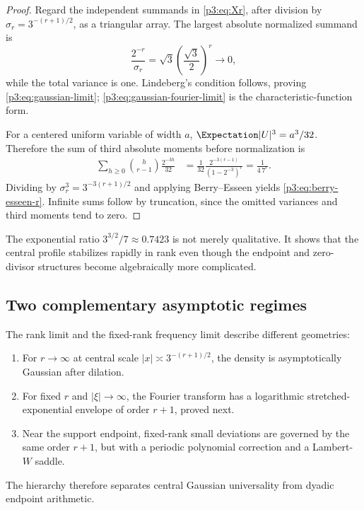 \documentclass[11pt,oneside]{article}
\theoremstyle{definition}
\theoremstyle{remark}
\begin{document}
\begin{proof}
Regard the independent summands in \eqref{p3:eq:Xr}, after division by
$\sigma_r=3^{-(r+1)/2}$, as a triangular array.  The largest absolute normalized summand is
\[
 \frac{2^{-r}}{\sigma_r}
 =\sqrt3\left(\frac{\sqrt3}{2}\right)^r\longrightarrow0,
\]
while the total variance is one.  Lindeberg's condition follows, proving \eqref{p3:eq:gaussian-limit}; \eqref{p3:eq:gaussian-fourier-limit} is the characteristic-function form.

For a centered uniform variable of width $a$, $\Expectation|U|^3=a^3/32$.  Therefore the sum of third absolute moments before normalization is
\begin{align*}
 \sum_{h\ge0}\binom h{r-1}\frac{2^{-3h}}{32}
 &=\frac1{32}\frac{2^{-3(r-1)}}{(1-2^{-3})^r}
 =\frac1{4\,7^r}.
\end{align*}
Dividing by $\sigma_r^3=3^{-3(r+1)/2}$ and applying Berry--Esseen yields \eqref{p3:eq:berry-esseen-r}.  Infinite sums follow by truncation, since the omitted variances and third moments tend to zero.
\end{proof}

\begin{remark}
The exponential ratio $3^{3/2}/7\approx0.7423$ is not merely qualitative.  It shows that the central profile stabilizes rapidly in rank even though the endpoint and zero-divisor structures become algebraically more complicated.
\end{remark}

\subsection{Two complementary asymptotic regimes}

The rank limit and the fixed-rank frequency limit describe different geometries:
\begin{enumerate}[label=(\alph*)]
\item For $r\to\infty$ at central scale $|x|\asymp3^{-(r+1)/2}$, the density is asymptotically Gaussian after dilation.
\item For fixed $r$ and $|\xi|\to\infty$, the Fourier transform has a logarithmic stretched-exponential envelope of order $r+1$, proved next.
\item Near the support endpoint, fixed-rank small deviations are governed by the same order $r+1$, but with a periodic polynomial correction and a Lambert-$W$ saddle.
\end{enumerate}
The hierarchy therefore separates central Gaussian universality from dyadic endpoint arithmetic.
\end{document}
